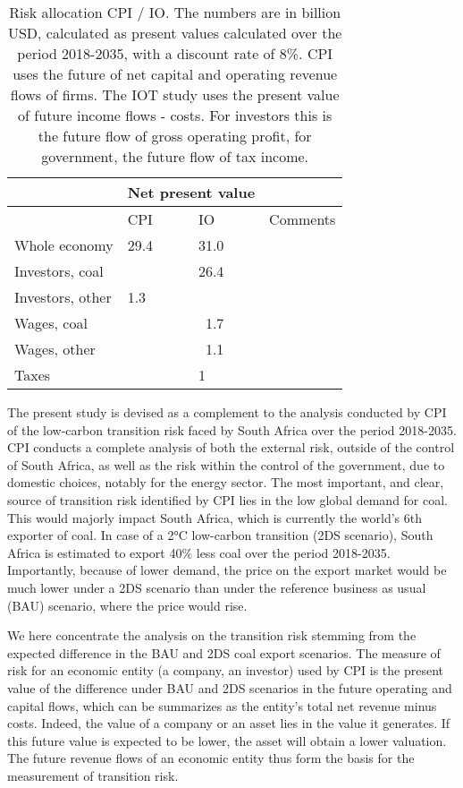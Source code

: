 \documentclass[12pt,english]{article}
\begin{document}
\begin{table}[!t]
	\centering
	\begin{tabular}{lp{80pt}p{80pt} p{200pt}}
		\toprule
	 &\multicolumn{2}{c}{Net present value} \\	
	 \midrule													
	& CPI & IO & Comments\\	

	 \midrule													
Whole economy	& 29.4  & 31.0 & \\	
Investors, coal	&   & 26.4  &  \\	
Investors, other	&  1.3 &  & \\	
Wages, coal	&  & \ 1.7  &  \\	
Wages, other	&   & \ 1.1 & \\	
Taxes	&   & 1 & \\	
		\bottomrule
	\end{tabular}
	\caption{\label{External risk}Risk allocation CPI / IO. The numbers are in billion USD, calculated as present values calculated over the period 2018-2035, with a discount rate of 8\%. CPI uses the future of net capital and operating revenue flows of firms. The IOT study uses the present value of future income flows - costs. For investors this is the future flow of gross operating profit, for government, the future flow of tax income.}
\end{table}

The present study is devised as a complement to the analysis conducted by CPI of the low-carbon transition risk faced by South Africa over the period 2018-2035. CPI conducts a complete analysis of both the external risk, outside of the control of South Africa, as well as the risk within the control of the government, due to domestic choices, notably for the energy sector. The most important, and clear, source of transition risk identified by CPI lies in the low global demand for coal. This would majorly impact South Africa, which is currently the world's 6th exporter of coal. In case of a 2°C low-carbon transition (2DS scenario), South Africa is estimated to export 40\% less coal over the period 2018-2035. Importantly, because of lower demand, the price on the export market would be much lower under a 2DS scenario than under the reference business as usual (BAU) scenario, where the price would rise. 

We here concentrate the analysis on the transition risk stemming from the expected difference in the BAU and 2DS coal export scenarios. The measure of risk for an economic entity (a company, an investor) used by CPI is the present value of the difference under BAU and 2DS scenarios in the future operating and capital flows, which can be summarizes as the entity's total net revenue minus costs. Indeed, the value of a company or an asset lies in the value it generates. If this future value is expected to be lower, the asset will obtain a lower valuation. The future revenue flows of an economic entity thus form the basis for the measurement of transition risk.
\end{document}
